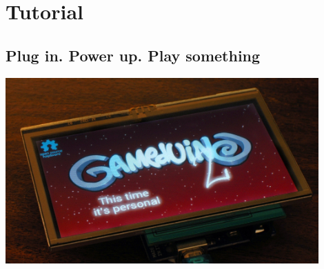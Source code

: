 \documentclass[10pt]{book}
\begin{document}
\vfill


\endgroup

\thispagestyle{empty}
\pagestyle{headings}

\tableofcontents

\part{Tutorial}

\chapter{Plug in. Power up. Play something}

\begin{center}
\includegraphics[width=0.9\textwidth]{assets/plugin.jpg}
\end{center}
\end{document}
